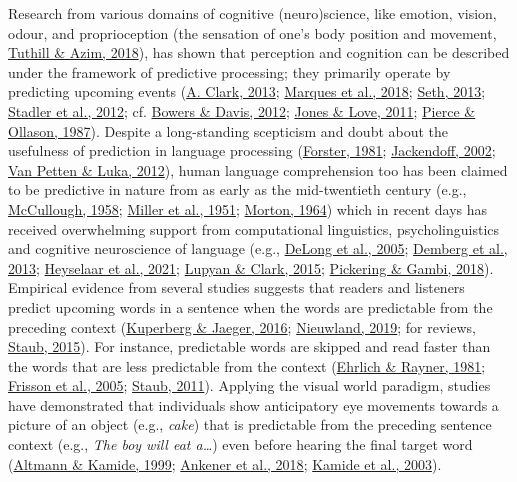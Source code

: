 \documentclass[a4paper, nobind]{templates/ociamthesis}
\begin{document}
Research from various domains of cognitive (neuro)science, like emotion, vision, odour, and proprioception (the sensation of one's body position and movement, \protect\hyperlink{ref-Tuthill2018}{Tuthill \& Azim, 2018}), has shown that perception and cognition can be described under the framework of predictive processing; they primarily operate by predicting upcoming events (\protect\hyperlink{ref-Clark2013}{A. Clark, 2013}; \protect\hyperlink{ref-Marques2018}{Marques et al., 2018}; \protect\hyperlink{ref-Seth2013}{Seth, 2013}; \protect\hyperlink{ref-Stadler2012}{Stadler et al., 2012}; cf. \protect\hyperlink{ref-Bowers2012}{Bowers \& Davis, 2012}; \protect\hyperlink{ref-Jones2011}{Jones \& Love, 2011}; \protect\hyperlink{ref-Pierce1987}{Pierce \& Ollason, 1987}).
Despite a long-standing scepticism and doubt about the usefulness of prediction in language processing (\protect\hyperlink{ref-Forster1981}{Forster, 1981}; \protect\hyperlink{ref-Jackendoff2002}{Jackendoff, 2002}; \protect\hyperlink{ref-VanPetten2012}{Van Petten \& Luka, 2012}),
human language comprehension too has been claimed to be predictive in nature from as early as the mid-twentieth century (e.g., \protect\hyperlink{ref-Mccullough1958}{McCullough, 1958}; \protect\hyperlink{ref-Miller1951}{Miller et al., 1951}; \protect\hyperlink{ref-Morton1964}{Morton, 1964})
which in recent days has received overwhelming support from computational linguistics, psycholinguistics and cognitive neuroscience of language (e.g., \protect\hyperlink{ref-Delong2005}{DeLong et al., 2005}; \protect\hyperlink{ref-Demberg2013}{Demberg et al., 2013}; \protect\hyperlink{ref-Heyselaar2021}{Heyselaar et al., 2021}; \protect\hyperlink{ref-Lupyan2015}{Lupyan \& Clark, 2015}; \protect\hyperlink{ref-Pickering2018}{Pickering \& Gambi, 2018}).
Empirical evidence from several studies suggests that readers and listeners predict upcoming words in a sentence when the words are predictable from the preceding context (\protect\hyperlink{ref-Kuperberg2016}{Kuperberg \& Jaeger, 2016}; \protect\hyperlink{ref-Nieuwland2019}{Nieuwland, 2019}; for reviews, \protect\hyperlink{ref-Staub2015}{Staub, 2015}).
For instance, predictable words are skipped and read faster than the words that are less predictable from the context (\protect\hyperlink{ref-Ehrlich1981}{Ehrlich \& Rayner, 1981}; \protect\hyperlink{ref-Frisson2005}{Frisson et al., 2005}; \protect\hyperlink{ref-Staub2011}{Staub, 2011}).
Applying the visual world paradigm, studies have demonstrated that individuals show anticipatory eye movements towards a picture of an object (e.g., \emph{cake}) that is predictable from the preceding sentence context (e.g., \emph{The boy will eat a\ldots{}}) even before hearing the final target word (\protect\hyperlink{ref-Altmann1999}{Altmann \& Kamide, 1999}; \protect\hyperlink{ref-Ankener2018}{Ankener et al., 2018}; \protect\hyperlink{ref-Kamide2003}{Kamide et al., 2003}).
\end{document}
